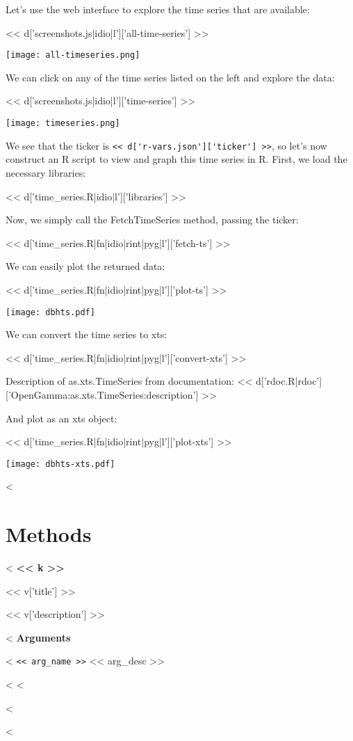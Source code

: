 \documentclass[a4paper]{amsart}
\begin{document}
Let's use the web interface to explore the time series that are available:

<< d['screenshots.js|idio|l']['all-time-series'] >>

\texttt{[image: all-timeseries.png]}

We can click on any of the time series listed on the left and explore the data:

<< d['screenshots.js|idio|l']['time-series'] >>

\texttt{[image: timeseries.png]}

We see that the ticker is \verb|<< d['r-vars.json']['ticker'] >>|, so let's now construct an R script to view and graph this time series in R. First, we load the necessary libraries:

<< d['time_series.R|idio|l']['libraries'] >>

Now, we simply call the FetchTimeSeries method, passing the ticker:

<< d['time_series.R|fn|idio|rint|pyg|l']['fetch-ts'] >>

We can easily plot the returned data:

<< d['time_series.R|fn|idio|rint|pyg|l']['plot-ts'] >>

\texttt{[image: dbhts.pdf]}

We can convert the time series to xts:

<< d['time_series.R|fn|idio|rint|pyg|l']['convert-xts'] >>

Description of as.xts.TimeSeries from documentation: << d['rdoc.R|rdoc']['OpenGamma:as.xts.TimeSeries:description'] >>

And plot as an xts object:

<< d['time_series.R|fn|idio|rint|pyg|l']['plot-xts'] >>

\texttt{[image: dbhts-xts.pdf]}

<%

\section{Methods}

<%
\vspace{1cm}
\large
\textbf{<< k >>}
\normalsize

<< v['title'] >>

<< v['description'] >>

<%
\vspace{0.5cm}
\textbf{Arguments}

\selectfont
<%
\verb|<< arg_name >>| << arg_desc >>

<%
\selectfont
<%

<%

<%
\end{document}
